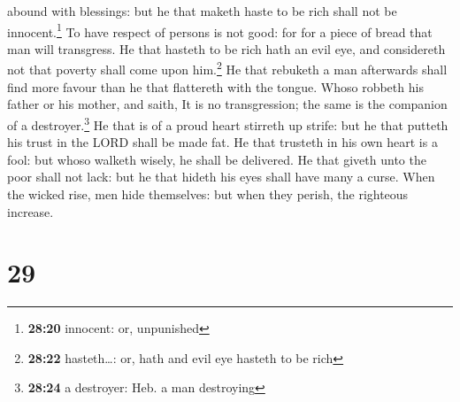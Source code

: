 abound with blessings: but he that maketh haste to be rich shall not be
innocent.\footnote{\textbf{28:20} innocent: or, unpunished}
 To have respect of persons is not good: for for a piece
of bread that man will transgress.  He that hasteth to be
rich hath an evil eye, and considereth not that poverty shall come upon
him.\footnote{\textbf{28:22} hasteth\ldots: or, hath and evil eye
  hasteth to be rich}  He that rebuketh a man afterwards
shall find more favour than he that flattereth with the tongue.
 Whoso robbeth his father or his mother, and saith, It is
no transgression; the same is the companion of a destroyer.\footnote{\textbf{28:24}
  a destroyer: Heb. a man destroying}  He that is of a
proud heart stirreth up strife: but he that putteth his trust in the
LORD shall be made fat.  He that trusteth in his own
heart is a fool: but whoso walketh wisely, he shall be delivered.
 He that giveth unto the poor shall not lack: but he that
hideth his eyes shall have many a curse.  When the wicked
rise, men hide themselves: but when they perish, the righteous increase.

\hypertarget{section-28}{%
\section{29}\label{section-28}}

